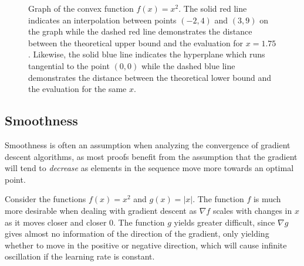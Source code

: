 \begin{figure}[t]
    \begin{center}
    \end{center}
    \caption{Graph of the convex function $f(x) = x^2$. The solid red line
    indicates an interpolation between points $(-2, 4)$ and $(3, 9)$ on the
    graph while the dashed red line demonstrates the distance between the
    theoretical upper bound and the evaluation for $x = 1.75$. Likewise, the
    solid blue line indicates the hyperplane which runs tangential to the point
    $(0, 0)$ while the dashed blue line demonstrates the distance between the
    theoretical lower bound and the evaluation for the same $x$.}%
    \label{fig:convex}
\end{figure}

\subsection{Smoothness}

Smoothness is often an assumption when analyzing the convergence of gradient
descent algorithms, as most proofs benefit from the assumption that the gradient
will tend to \emph{decrease} as elements in the sequence move more towards an
optimal point. 

\begin{example}
    Consider the functions $f(x) = x^2$ and $g(x) = |x|$. The function $f$ is
    much more desirable when dealing with gradient descent as $\nabla f$ scales
    with changes in $x$ as it moves closer and closer 0. The
    function $g$ yields greater difficult, since $\nabla g$ gives almost no
    information of the direction of the gradient, only yielding whether to move
    in the positive or negative direction, which will cause infinite oscillation
    if the learning rate is constant.
\end{example}


